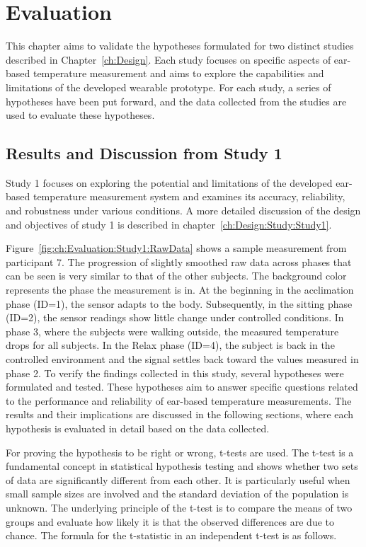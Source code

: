 \chapter{Evaluation}
\label{ch:Evaluation}
This chapter aims to validate the hypotheses formulated for two distinct studies described in Chapter~\ref{ch:Design}. 
Each study focuses on specific aspects of ear-based temperature measurement and aims to explore the capabilities and limitations of the developed wearable prototype. 
For each study, a series of hypotheses have been put forward, and the data collected from the studies are used to evaluate these hypotheses.

\section{Results and Discussion from Study 1}
\label{sec:Evaluation:Study1}
Study 1 focuses on exploring the potential and limitations of the developed ear-based temperature measurement system and examines its accuracy, reliability, and robustness under various conditions. 
A more detailed discussion of the design and objectives of study 1 is described in chapter~\ref{ch:Design:Study:Study1}.

Figure~\ref{fig:ch:Evaluation:Study1:RawData} shows a sample measurement from participant 7.
The progression of slightly smoothed raw data across phases that can be seen is very similar to that of the other subjects. 
The background color represents the phase the measurement is in.
At the beginning in the acclimation phase (ID=1), the sensor adapts to the body. 
Subsequently, in the sitting phase (ID=2), the sensor readings show little change under controlled conditions.
In phase 3, where the subjects were walking outside, the measured temperature drops for all subjects.
In the Relax phase (ID=4), the subject is back in the controlled environment and the signal settles back toward the values measured in phase 2.
To verify the findings collected in this study, several hypotheses were formulated and tested. 
These hypotheses aim to answer specific questions related to the performance and reliability of ear-based temperature measurements. 
The results and their implications are discussed in the following sections, where each hypothesis is evaluated in detail based on the data collected.

For proving the hypothesis to be right or wrong, t-tests are used.
The t-test is a fundamental concept in statistical hypothesis testing and shows whether two sets of data are significantly different from each other. 
It is particularly useful when small sample sizes are involved and the standard deviation of the population is unknown.
The underlying principle of the t-test is to compare the means of two groups and evaluate how likely it is that the observed differences are due to chance.
The formula for the t-statistic in an independent t-test is as follows.

